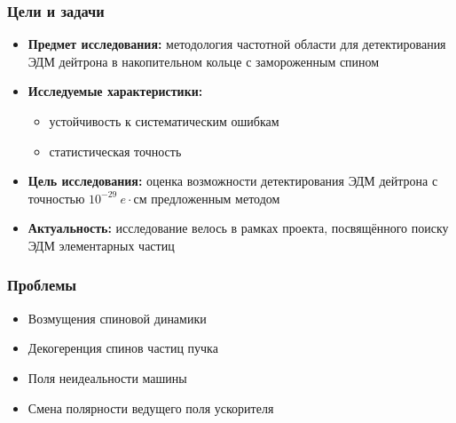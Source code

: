 \documentclass[14pt]{beamer}
\title{\small{\thesisTitle}}
\author{\small{%
\emph{Выступающий:}~\thesisAuthorShort\\%
\emph{Руководитель:}~\supervisorARegaliaShort~\supervisorAFioShort
}\\%
\vspace{30pt}%
\thesisOrganization%
\vspace{20pt}%
}
\date{\small{\thesisCity, \thesisYear}}
\begin{document}
\maketitle

\begin{frame}
\frametitle{Цели и задачи}
\begin{itemize}
  \item \textbf{Предмет исследования:} методология частотной области для детектирования ЭДМ дейтрона в накопительном кольце с замороженным спином
  \item \textbf{Исследуемые характеристики:} 
  \begin{itemize}
  	\item устойчивость к систематическим ошибкам
  	\item статистическая точность
  \end{itemize}
  \item \textbf{Цель исследования:} оценка возможности детектирования ЭДМ дейтрона с точностью $10^{-29}~e\cdot$см предложенным методом
  \item \textbf{Актуальность:} исследование велось в рамках проекта, посвящённого поиску ЭДМ элементарных частиц
\end{itemize}
\end{frame}

\begin{frame}
\frametitle{Проблемы}
\begin{itemize}
  \item Возмущения спиновой динамики
  \item Декогеренция спинов частиц пучка
  \item Поля неидеальности машины
  \item Смена полярности ведущего поля ускорителя
\end{itemize}
\end{frame}
\end{document}
